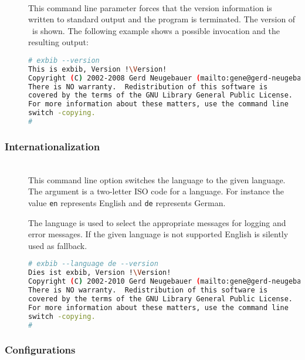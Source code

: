 \begin{description}
\item[]\ \\
  This command line parameter forces that the version information is
  written to standard output and the program is
  terminated. The version of \ExBib\ is shown. The
  following example shows a possible invocation and the resulting
  output:
\begin{lstlisting}[language=sh,escapechar=!]
# exbib --version
This is exbib, Version !\Version!
Copyright (C) 2002-2008 Gerd Neugebauer (mailto:gene@gerd-neugebauer.de).
There is NO warranty.  Redistribution of this software is
covered by the terms of the GNU Library General Public License.
For more information about these matters, use the command line
switch -copying.
#
\end{lstlisting}
\end{description}


\subsubsection{Internationalization}

\begin{description}
\item[ ]
\item[ ]\ \\
  This command line option switches the language to the given
  language. The argument is a two-letter ISO code for a language. For
  instance the value \texttt{en} represents English and \texttt{de}
  represents German.

  The language is used to select the appropriate messages for logging
  and error messages. If the given language is not supported English
  is silently used as fallback.
\begin{lstlisting}[language=sh,escapechar=!]
# exbib --language de --version
Dies ist exbib, Version !\Version!
Copyright (C) 2002-2010 Gerd Neugebauer (mailto:gene@gerd-neugebauer.de).
There is NO warranty.  Redistribution of this software is
covered by the terms of the GNU Library General Public License.
For more information about these matters, use the command line
switch -copying.
#
\end{lstlisting}
\end{description}


\subsubsection{Configurations}%
\label{sec:cli.cfg}%

